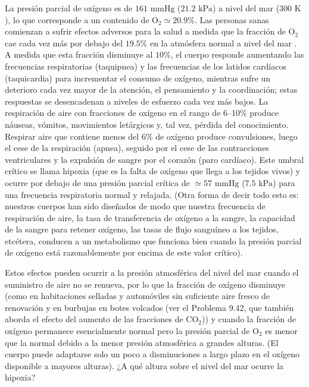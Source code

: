 \documentclass[12pt]{book}
\begin{document}
La presión parcial de oxígeno es de $161\text{ mmHg}$ ($21.2\text{ kPa}$) a nivel del mar ($300\text{ K}$), lo que corresponde a un contenido de $\text{O}_2 \simeq 20.9\%$. Las personas sanas comienzan a sufrir efectos adversos para la salud a medida que la fracción de $\text{O}_2$ cae cada vez más por debajo del $19.5\%$ en la atmósfera normal a nivel del mar \cite{23, 29}. A medida que esta fracción disminuye al $10\%$, el cuerpo responde aumentando las frecuencias respiratorias (taquipnea) y las frecuencias de los latidos cardíacos (taquicardia) para incrementar el consumo de oxígeno, mientras sufre un deterioro cada vez mayor de la atención, el pensamiento y la coordinación; estas respuestas se desencadenan a niveles de esfuerzo cada vez más bajos. La respiración de aire con fracciones de oxígeno en el rango de 6--10\% produce náuseas, vómitos, movimientos letárgicos y, tal vez, pérdida del conocimiento. Respirar aire que contiene menos del 6\% de oxígeno produce convulsiones, luego el cese de la respiración (apnea), seguido por el cese de las contracciones ventriculares y la expulsión de sangre por el corazón (paro cardíaco). Este umbral crítico se llama hipoxia (que es la falta de oxígeno que llega a los tejidos vivos) y ocurre por debajo de una presión parcial crítica de $\simeq 57\text{ mmHg}$ ($7.5\text{ kPa}$) para una frecuencia respiratoria normal y relajada. (Otra forma de decir todo esto es: nuestros cuerpos han sido diseñados de modo que nuestra frecuencia de respiración de aire, la tasa de transferencia de oxígeno a la sangre, la capacidad de la sangre para retener oxígeno, las tasas de flujo sanguíneo a los tejidos, etcétera, conducen a un metabolismo que funciona bien cuando la presión parcial de oxígeno está razonablemente por encima de este valor crítico).


Estos efectos pueden ocurrir a la presión atmosférica del nivel del mar cuando el suministro de aire no se renueva, por lo que la fracción de oxígeno disminuye (como en habitaciones selladas y automóviles sin suficiente aire fresco de renovación y en burbujas en botes volcados (ver el Problema 9.42, que también aborda el efecto del aumento de las fracciones de $\text{CO}_2$)) y cuando la fracción de oxígeno permanece esencialmente normal pero la presión parcial de $\text{O}_2$ es menor que la normal debido a la menor presión atmosférica a grandes alturas. (El cuerpo puede adaptarse solo un poco a disminuciones a largo plazo en el oxígeno disponible a mayores alturas). ¿A qué altura sobre el nivel del mar ocurre la hipoxia?
\end{document}
